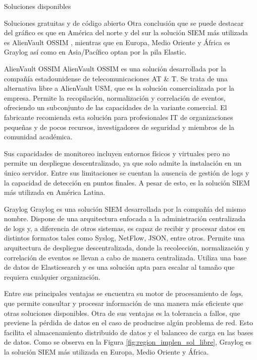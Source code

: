 \begin{section}{Soluciones disponibles}
\begin{subsection}{Soluciones gratuitas y de código abierto}
        Otra conclusión que se puede destacar del gráfico es que en América del norte y del sur la solución SIEM más utilizada es AlienVault OSSIM \cite{alienvault_ossim}, mientras que en Europa, Medio Oriente y África es Graylog \cite{graylog} así como en Asia/Pacífico optan por la pila Elastic\cite{elastic}.\par
        
            \begin{subsubsection}{AlienVault OSSIM}
            AlienVault OSSIM \cite{alienvault_ossim} es una solución desarrollada por la compañía estadounidense de telecomunicaciones AT \& T. Se trata de una alternativa libre a AlienVault USM, que es la solución comercializada por la empresa. Permite la recopilación, normalización y correlación de eventos, ofreciendo un subconjunto de las capacidades de la variante comercial. El fabricante recomienda esta solución para profesionales IT de organizaciones pequeñas y de pocos recursos, investigadores de seguridad y miembros de la comunidad académica. \par
            Sus capacidades de monitoreo incluyen entornos físicos y virtuales pero no permite un despliegue descentralizado, ya que solo admite la instalación en un único servidor. Entre sus limitaciones se cuentan la ausencia de gestión de logs y la capacidad de detección en puntos finales. A pesar de esto, es la solución SIEM más utilizada en América Latina.

            \end{subsubsection}
            \begin{subsubsection}{Graylog}
            Graylog \cite{graylog} es una solución SIEM desarrollada por la compañía del mismo nombre. Dispone de una arquitectura enfocada a la administración centralizada de logs y, a diferencia de otros sistemas, es capaz de recibir y procesar datos en distintos formatos tales como Syslog, NetFlow, JSON, entre otros. Permite una arquitectura de despliegue descentralizada, donde la recolección, normalización y correlación de eventos se llevan a cabo de manera centralizada. Utiliza una base de datos de Elasticsearch y es una solución apta para escalar al tamaño que requiera cualquier organización. \par 
            Entre sus principales ventajas se encuentra su motor de procesamiento de \textit{logs}, que permite consultar y procesar información de una manera más eficiente que otras soluciones disponibles. Otra de sus ventajas es la tolerancia a fallos, que previene la pérdida de datos en el caso de producirse algún problema de red. Esto facilita el almacenamiento distribuido de datos y el balanceo de carga en las bases de datos. Como se observa en la Figura \ref{fig:region_implen_sol_libre}, Graylog es la solución SIEM más utilizada en Europa, Medio Oriente y África.


\end{subsubsection}
\end{subsection}
\end{section}
